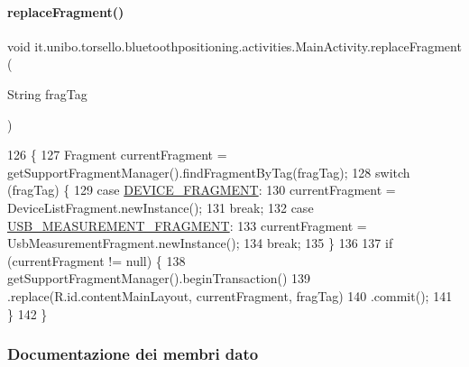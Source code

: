 \paragraph{\texorpdfstring{replace\+Fragment()}{replaceFragment()}}
{\footnotesize\ttfamily void it.\+unibo.\+torsello.\+bluetoothpositioning.\+activities.\+Main\+Activity.\+replace\+Fragment (\begin{DoxyParamCaption}\item[{String}]{frag\+Tag }\end{DoxyParamCaption})}


\begin{DoxyCode}
126                                                 \{
127         Fragment currentFragment = getSupportFragmentManager().findFragmentByTag(fragTag);
128         \textcolor{keywordflow}{switch} (fragTag) \{
129             \textcolor{keywordflow}{case} \hyperlink{classit_1_1unibo_1_1torsello_1_1bluetoothpositioning_1_1activities_1_1MainActivity_a2f77c0245ac2525dc58905e38e1817d1_a2f77c0245ac2525dc58905e38e1817d1}{DEVICE\_FRAGMENT}:
130                 currentFragment = DeviceListFragment.newInstance();
131                 \textcolor{keywordflow}{break};
132             \textcolor{keywordflow}{case} \hyperlink{classit_1_1unibo_1_1torsello_1_1bluetoothpositioning_1_1activities_1_1MainActivity_a64bac06e6db556ba1e36c8773e61137b_a64bac06e6db556ba1e36c8773e61137b}{USB\_MEASUREMENT\_FRAGMENT}:
133                 currentFragment = UsbMeasurementFragment.newInstance();
134                 \textcolor{keywordflow}{break};
135         \}
136 
137         \textcolor{keywordflow}{if} (currentFragment != null) \{
138             getSupportFragmentManager().beginTransaction()
139                     .replace(R.id.contentMainLayout, currentFragment, fragTag)
140                     .commit();
141         \}
142     \}
\end{DoxyCode}


\subsubsection{Documentazione dei membri dato}
\hypertarget{classit_1_1unibo_1_1torsello_1_1bluetoothpositioning_1_1activities_1_1MainActivity_a5e1ae38b2bbdcc45f2164fdc393ca495_a5e1ae38b2bbdcc45f2164fdc393ca495}{}\label{classit_1_1unibo_1_1torsello_1_1bluetoothpositioning_1_1activities_1_1MainActivity_a5e1ae38b2bbdcc45f2164fdc393ca495_a5e1ae38b2bbdcc45f2164fdc393ca495} 
